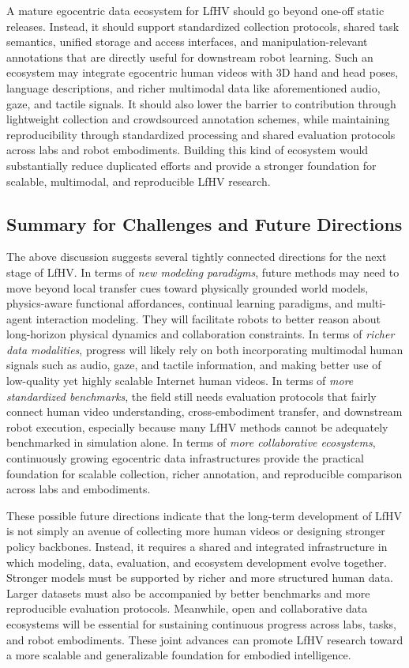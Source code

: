 \documentclass[Afour,sageh,times]{sagej}
\begin{document}
A mature egocentric data ecosystem for LfHV should go beyond one-off static releases. Instead, it should support standardized collection protocols, shared task semantics, unified storage and access interfaces, and manipulation-relevant annotations that are directly useful for downstream robot learning. Such an ecosystem may integrate egocentric human videos with 3D hand and head poses, language descriptions, and richer multimodal data like aforementioned audio, gaze, and tactile signals. It should also lower the barrier to contribution through lightweight collection and crowdsourced annotation schemes, while maintaining reproducibility through standardized processing and shared evaluation protocols across labs and robot embodiments. Building this kind of ecosystem would substantially reduce duplicated efforts and provide a stronger foundation for scalable, multimodal, and reproducible LfHV research.


\subsection{Summary for Challenges and Future Directions}

The above discussion suggests several tightly connected directions for the next stage of LfHV. In terms of \textit{new modeling paradigms}, future methods may need to move beyond local transfer cues toward physically grounded world models, physics-aware functional affordances, continual learning paradigms, and multi-agent interaction modeling. They will facilitate robots to better reason about long-horizon physical dynamics and collaboration constraints. In terms of \textit{richer data modalities}, progress will likely rely on both incorporating multimodal human signals such as audio, gaze, and tactile information, and making better use of low-quality yet highly scalable Internet human videos. In terms of \textit{more standardized benchmarks}, the field still needs evaluation protocols that fairly connect human video understanding, cross-embodiment transfer, and downstream robot execution, especially because many LfHV methods cannot be adequately benchmarked in simulation alone. In terms of \textit{more collaborative ecosystems}, continuously growing egocentric data infrastructures provide the practical foundation for scalable collection, richer annotation, and reproducible comparison across labs and embodiments.


These possible future directions indicate that the long-term development of LfHV is not simply an avenue of collecting more human videos or designing stronger policy backbones. Instead, it requires a shared and integrated infrastructure in which modeling, data, evaluation, and ecosystem development evolve together. Stronger models must be supported by richer and more structured human data. Larger datasets must also be accompanied by better benchmarks and more reproducible evaluation protocols. Meanwhile, open and collaborative data ecosystems will be essential for sustaining continuous progress across labs, tasks, and robot embodiments. These joint advances can promote LfHV research toward a more scalable and generalizable foundation for embodied intelligence.
\end{document}
